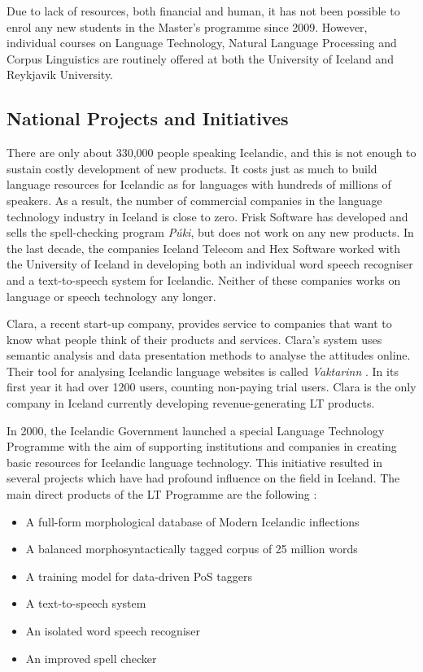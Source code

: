 \begin{multicols}{2}
Due to lack of resources, both financial and human, it has not been possible to enrol any new students in the Master’s programme since 2009. However, individual courses on Language Technology, Natural Language Processing and Corpus Linguistics are routinely offered at both the University of Iceland and Reykjavik University.

\subsection{National Projects and Initiatives}

There are only about 330,000 people speaking Icelandic, and this is not enough to sustain costly development of new products. It costs just as much to build language resources for Icelandic as for languages with hundreds of millions of speakers. As a result, the number of commercial companies in the language technology industry in Iceland is close to zero. Frisk Software has developed and sells the spell-checking program \textit{Púki}, but does not work on any new products. In the last decade, the companies Iceland Telecom and Hex Software worked with the University of Iceland in developing both an individual word speech recogniser and a text-to-speech system for Icelandic. Neither of these companies works on language or speech technology any longer.

Clara, a recent start-up company, provides service to companies that want to know what people think of their products and services. Clara’s system uses semantic analysis and data presentation methods to analyse the attitudes online. Their tool for analysing Icelandic language websites is called \textit{Vaktarinn} \cite{vak1}.  In its first year it had over 1200 users, counting non-paying trial users. Clara is the only company in Iceland currently developing revenue-generating LT products.

In 2000, the Icelandic Government launched a special Language Technology Programme with the aim of supporting institutions and companies in creating basic resources for Icelandic language technology. This initiative resulted in several projects which have had profound influence on the field in Iceland. The main direct products of the LT Programme are the following \cite{ilrt1}: 

\begin{itemize}
\item A full-form morphological database of Modern Icelandic inflections
\item A balanced morphosyntactically tagged corpus of 25 million words
\item A training model for data-driven PoS taggers
\item A text-to-speech system
\item An isolated word speech recogniser
\item An improved spell checker
\end{itemize}


\end{multicols}
